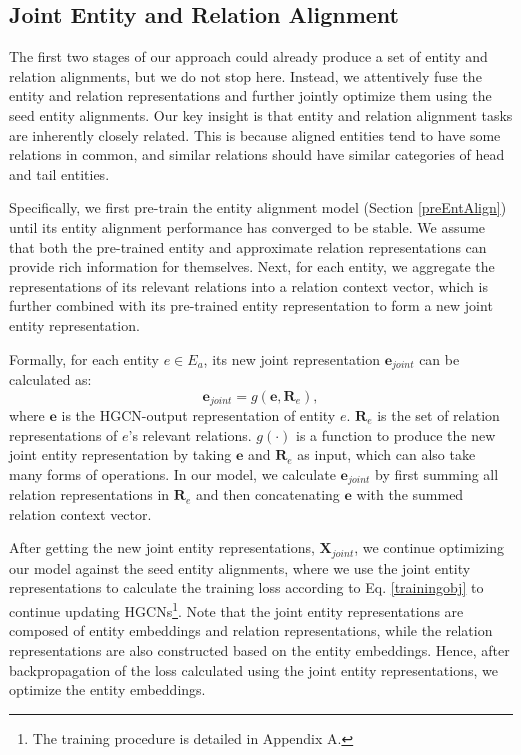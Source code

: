 \documentclass[11pt,a4paper]{article}
\begin{document}
\subsection{Joint Entity and Relation Alignment}
\label{subsection:joint}
The first two stages of our approach could already produce a set of entity and relation alignments, but we do not stop here.
Instead, we attentively fuse the entity and relation representations and further jointly optimize them using the seed entity alignments.
Our key insight is that entity and relation alignment tasks are
inherently closely related. This is because aligned entities tend to have some relations in common, and similar relations should have
similar categories of head and tail entities.

Specifically, we first pre-train the entity alignment model (Section \ref{preEntAlign}) until its entity alignment performance has converged to be
stable. We assume that both the pre-trained entity and approximate relation representations can provide rich information for themselves.
Next, for each entity, we aggregate the representations of its relevant relations into
a relation context vector, which is further combined
with its pre-trained entity representation to form a new joint entity representation.


Formally, for each entity $e \in E_a$, its new joint representation  $\bm{e}_{joint}$ can be calculated as:
\begin{equation}
\label{jointEmbeddings}
\bm{e}_{joint} = g(\bm{e}, \textbf{R}_e),
\end{equation}
where $\bm{e}$ is the HGCN-output representation of entity $e$.
$\textbf{R}_e$ is the set of relation representations of $e$'s relevant relations. $g(\cdot)$ is a function to produce the new joint entity representation by taking $\bm{e}$ and $\textbf{R}_e$ as input, which can also take many forms of operations. In our model, we calculate
$\bm{e}_{joint}$ by first summing all relation representations in $\textbf{R}_e$ and then concatenating $\bm{e}$ with the summed relation context vector.


After getting the new joint entity representations, $\textbf{X}_{joint}$, we continue optimizing our model against the seed entity alignments, where we use the joint entity representations to calculate the training loss according to Eq. \ref{trainingobj} to continue updating HGCNs\footnote{The training procedure is detailed in Appendix A.}. Note that the joint entity representations are composed of entity embeddings and relation representations, while the relation representations are also constructed based on the entity embeddings. Hence, after backpropagation of the loss calculated using the joint entity representations, we optimize the entity embeddings.
\end{document}
